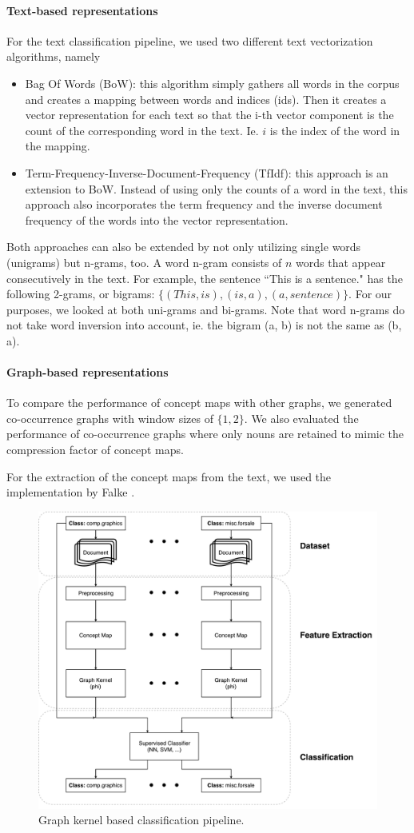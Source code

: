 \paragraph{Text-based representations}
For the text classification pipeline, we used two different text vectorization algorithms, namely
\begin{itemize}
\item{Bag Of Words (BoW): this algorithm simply gathers all words in the corpus and creates a mapping between words and indices (ids). Then it creates a vector representation for each text so that the i-th vector component is the count of the corresponding word in the text. Ie. $i$ is the index of the word in the mapping.}
\item{Term-Frequency-Inverse-Document-Frequency (TfIdf): this approach is an extension to BoW. Instead of using only the counts of a word in the text, this approach also incorporates the term frequency and the inverse document frequency of the words into the vector representation.}
\end{itemize}
Both approaches can also be extended by not only utilizing single words (unigrams) but n-grams, too. A word n-gram consists of $n$ words that appear consecutively in the text.
For example, the sentence ``This is a sentence." has the following 2-grams, or bigrams: $\{ (This, is), (is, a), (a, sentence) \}$.
For our purposes, we looked at both uni-grams and bi-grams.
Note that word n-grams do not take word inversion into account, ie. the bigram (a, b) is not the same as (b, a).

\paragraph{Graph-based representations}
To compare the performance of concept maps with other graphs, we generated co-occurrence graphs with window sizes of $\{1, 2\}$.
We also evaluated the performance of co-occurrence graphs where only nouns are retained to mimic the compression factor of concept maps.

For the extraction of the concept maps from the text, we used the implementation by Falke \cite{Falke2017}.

\begin{figure}[ht]
\centering\includegraphics[width=0.6\linewidth]{assets/figures/approach.pdf}
\caption{Graph kernel based classification pipeline.}
\end{figure}


